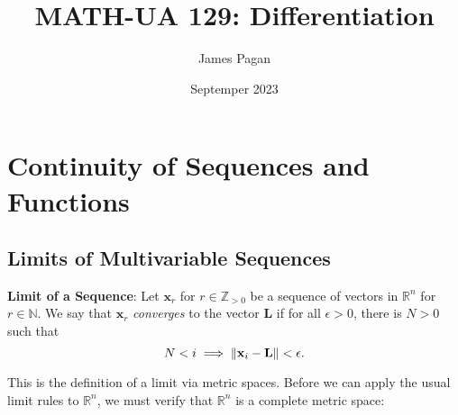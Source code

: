 \documentclass[11pt]{article}
\title{MATH-UA 129: Differentiation}
\author{James Pagan}
\date{Septemper 2023}
\renewcommand{\vec}[1]{\mathbf{#1}}
\begin{document}
\maketitle
\tableofcontents

\newpage


\section{Continuity of Sequences and Functions}


\subsection{Limits of Multivariable Sequences}

\textbf{Limit of a Sequence}: Let $\vec{x}_{r}$ for $r \in \mathbb{Z}_{> 0}$ be a sequence of vectors in $\mathbb{R}^{n}$ for $r \in \mathbb{N}$. We say that $\vec{x}_{r}$ \textit{converges} to the vector $\vec{L}$ if for all $\epsilon > 0$, there is $N > 0$ such that
\[
	N < i \implies \norm{\vec{x}_{i} - \vec{L}} < \epsilon.
\]

This is the definition of a limit via metric spaces. Before we can apply the usual limit rules to $\mathbb{R}^{n}$, we must verify that $\mathbb{R}^{n}$ is a complete metric space: 
\end{document}
